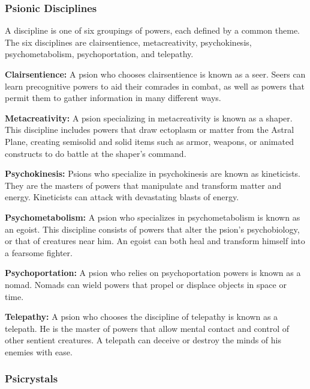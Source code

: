\subsubsection{Psionic Disciplines}
A discipline is one of six groupings of powers, each defined by a common theme. The six disciplines are clairsentience, metacreativity, psychokinesis, psychometabolism, psychoportation, and telepathy.

\textbf{Clairsentience:} A psion who chooses clairsentience is known as a seer. Seers can learn precognitive powers to aid their comrades in combat, as well as powers that permit them to gather information in many different ways.

\textbf{Metacreativity:} A psion specializing in metacreativity is known as a shaper. This discipline includes powers that draw ectoplasm or matter from the Astral Plane, creating semisolid and solid items such as armor, weapons, or animated constructs to do battle at the shaper's command.

\textbf{Psychokinesis:} Psions who specialize in psychokinesis are known as kineticists. They are the masters of powers that manipulate and transform matter and energy. Kineticists can attack with devastating blasts of energy.

\textbf{Psychometabolism:} A psion who specializes in psychometabolism is known as an egoist. This discipline consists of powers that alter the psion's psychobiology, or that of creatures near him. An egoist can both heal and transform himself into a fearsome fighter.

\textbf{Psychoportation:} A psion who relies on psychoportation powers is known as a nomad. Nomads can wield powers that propel or displace objects in space or time.

\textbf{Telepathy:} A psion who chooses the discipline of telepathy is known as a telepath. He is the master of powers that allow mental contact and control of other sentient creatures. A telepath can deceive or destroy the minds of his enemies with ease.

\subsubsection{Psicrystals}

